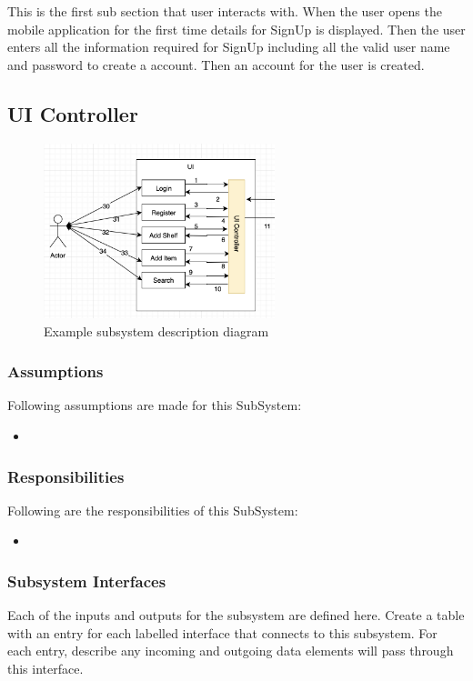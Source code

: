 This is the first sub section that user interacts with. When the user opens the mobile application for the first time details for SignUp is displayed. Then the user enters all the information required for SignUp including all the valid user name and password to create a account. Then an account for the user is created.

\subsection{UI Controller}


\begin{figure}[h!]
	\centering
 	\includegraphics[width=0.60\textwidth]{images/uicontroller}
 \caption{Example subsystem description diagram}
\end{figure}

\subsubsection{Assumptions}
Following assumptions are made for this SubSystem:
\begin{itemize}
    \item 
\end{itemize}

\subsubsection{Responsibilities}
Following are the responsibilities of this SubSystem:
\begin{itemize}
    \item 
\end{itemize}

\subsubsection{Subsystem Interfaces}
Each of the inputs and outputs for the subsystem are defined here. Create a table with an entry for each labelled interface that connects to this subsystem. For each entry, describe any incoming and outgoing data elements will pass through this interface.

